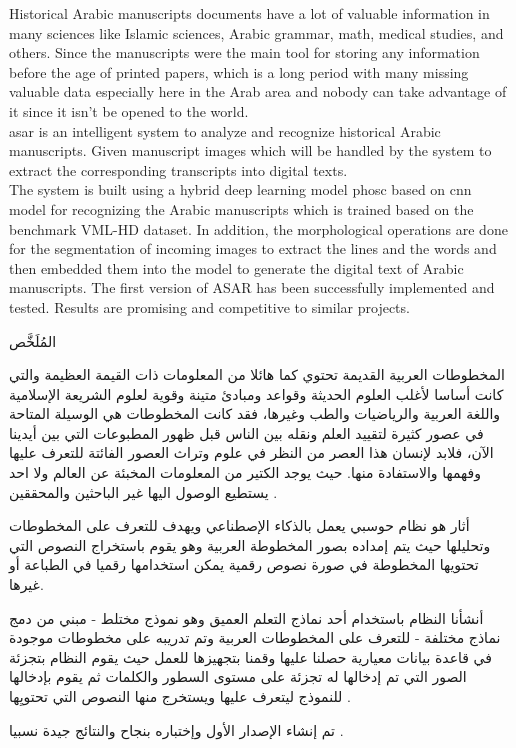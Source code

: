 Historical Arabic manuscripts documents have a lot of valuable information in many sciences like Islamic sciences, Arabic grammar, math, medical studies, and others. Since the manuscripts were the main tool for storing any information before the age of printed papers, which is a long period with many missing valuable data especially here in the Arab area and nobody can take advantage of it since it isn't be opened to the world. \\


\noindent
\acrfull{asar} is an intelligent system to analyze and recognize historical Arabic manuscripts. Given manuscript images which will be handled by the system to extract the corresponding transcripts into digital texts. \\ 

\noindent
The system is built using a hybrid deep learning model \acrfull{phosc} based on \acrfull{cnn} model for recognizing the Arabic manuscripts which is trained based on the benchmark VML-HD dataset. In addition, the morphological operations are done for the segmentation of incoming images to extract the lines and the words and then embedded them into the model to generate the digital text of Arabic manuscripts. The first version of ASAR has been successfully implemented and tested. Results are promising and competitive to similar projects.

\newpage

\begin{arabtext}
{\huge
المُلَخَّص
}\vspace{20pt}

المخطوطات العربية القديمة تحتوي كما هائلا من المعلومات ذات القيمة العظيمة والتي كانت أساسا لأغلب العلوم الحديثة وقواعد ومبادئ متينة وقوية لعلوم الشريعة الإسلامية واللغة العربية والرياضيات والطب وغيرها، فقد كانت المخطوطات هي الوسيلة المتاحة في عصور كثيرة لتقييد العلم ونقله بين الناس قبل ظهور المطبوعات التي بين أيدينا الآن، فلابد لإنسان هذا العصر من النظر في علوم وتراث العصور الفائتة للتعرف عليها وفهمها والاستفادة منها. حيث يوجد الكتير من المعلومات المخبئة عن العالم ولا احد يستطيع الوصول اليها غير الباحثين والمحققين .

\vspace{\baselineskip}

أثار هو نظام حوسبي يعمل بالذكاء الإصطناعي ويهدف للتعرف على المخطوطات وتحليلها حيث يتم إمداده بصور المخطوطة العربية وهو يقوم باستخراج النصوص التي تحتويها المخطوطة في صورة نصوص رقمية يمكن استخدامها رقميا في الطباعة أو غيرها.

\vspace{\baselineskip}

أنشأنا النظام باستخدام أحد نماذج التعلم العميق وهو نموذج مختلط - مبني من دمج نماذج مختلفة - للتعرف على المخطوطات العربية وتم تدريبه على مخطوطات موجودة في قاعدة بيانات معيارية حصلنا عليها وقمنا بتجهيزها للعمل حيث يقوم النظام بتجزئة الصور التي تم إدخالها له تجزئة على مستوى السطور والكلمات ثم يقوم بإدخالها للنموذج ليتعرف عليها ويستخرج منها النصوص التي تحتويِها .

 تم إنشاء الإصدار الأول وإختباره بنجاح والنتائج جيدة نسبيا .
\end{arabtext}
\newpage


